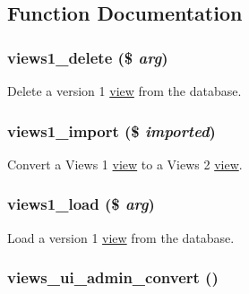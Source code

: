 \subsection{Function Documentation}
\hypertarget{convert_8inc_9f7d9a6b600935de6e5ed9ff947bfed8}{
\subsubsection[{views1\_\-delete}]{\setlength{\rightskip}{0pt plus 5cm}views1\_\-delete (\$ {\em arg})}}
\label{convert_8inc_9f7d9a6b600935de6e5ed9ff947bfed8}


Delete a version 1 \hyperlink{classview}{view} from the database. \hypertarget{convert_8inc_0a6dfe46ad7fe5c706ac52e4e27e7c2f}{
\subsubsection[{views1\_\-import}]{\setlength{\rightskip}{0pt plus 5cm}views1\_\-import (\$ {\em imported})}}
\label{convert_8inc_0a6dfe46ad7fe5c706ac52e4e27e7c2f}


Convert a Views 1 \hyperlink{classview}{view} to a Views 2 \hyperlink{classview}{view}. \hypertarget{convert_8inc_51f4ca218bd8d9f46f486bf5b7be1862}{
\subsubsection[{views1\_\-load}]{\setlength{\rightskip}{0pt plus 5cm}views1\_\-load (\$ {\em arg})}}
\label{convert_8inc_51f4ca218bd8d9f46f486bf5b7be1862}


Load a version 1 \hyperlink{classview}{view} from the database. \hypertarget{convert_8inc_4973172fbb47b6bca489dcb7ee39acbd}{
\subsubsection[{views\_\-ui\_\-admin\_\-convert}]{\setlength{\rightskip}{0pt plus 5cm}views\_\-ui\_\-admin\_\-convert ()}}
\label{convert_8inc_4973172fbb47b6bca489dcb7ee39acbd}


